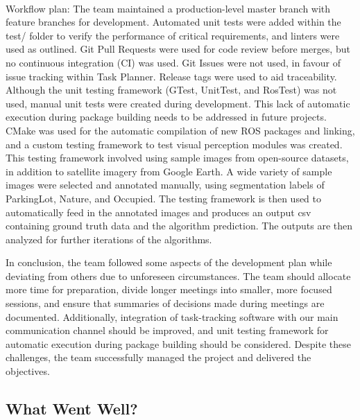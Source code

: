 \documentclass{article}
\begin{document}
\\ \indent Workflow plan: The team maintained a production-level master branch with feature branches for development. Automated unit tests were added within the test/ folder to verify the performance of critical requirements, and linters were used as outlined. Git Pull Requests were used for code review before merges, but no continuous integration (CI) was used. Git Issues were not used, in favour of issue tracking within Task Planner. Release tags were used to aid traceability. Although the unit testing framework (GTest, UnitTest, and RosTest) was not used, manual unit tests were created during development. This lack of automatic execution during package building needs to be addressed in future projects. CMake was used for the automatic compilation of new ROS packages and linking, and a custom testing framework to test visual perception modules was created. This testing framework involved using sample images from open-source datasets, in addition to satellite imagery from Google Earth. A wide variety of sample images were selected and annotated manually, using segmentation labels of ParkingLot, Nature, and Occupied. The testing framework is then used to automatically feed in the annotated images and produces an output csv containing ground truth data and the algorithm prediction. The outputs are then analyzed for further iterations of the algorithms.

In conclusion, the team followed some aspects of the development plan while deviating from others due to unforeseen circumstances. The team should allocate more time for preparation, divide longer meetings into smaller, more focused sessions, and ensure that summaries of decisions made during meetings are documented. Additionally, integration of task-tracking software with our main communication channel should be improved, and unit testing framework for automatic execution during package building should be considered. Despite these challenges, the team successfully managed the project and delivered the objectives.


\subsection{What Went Well?}
\end{document}
